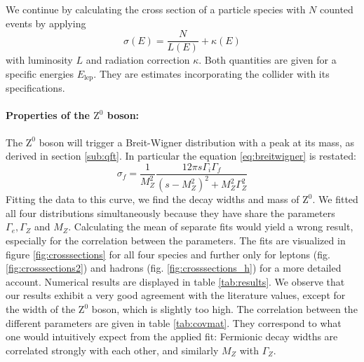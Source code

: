 We continue by calculating the cross section of a particle species with $N$ counted events by applying  
\begin{equation}
    \sigma(E) = \frac{N}{L(E)} + \kappa(E)
\end{equation}
with luminosity $L$ and radiation correction $\kappa$. Both quantities are given for a specific energies $E_\mathrm{lep}$. 
They are estimates incorporating the collider with its specifications.
\paragraph{\textbf{Properties of the $\mathrm{Z^0}$ boson:}}
\label{par:Z0}
The $\mathrm{Z^0}$ boson will trigger a Breit-Wigner distribution
with a peak at its mass, as derived in section \ref{sub:qft}. In particular the equation 
\eqref{eq:breitwigner} is restated:
\begin{equation*}
    \sigma_f = \frac{1}{M_Z^2} \frac{12\pi s \Gamma_i \Gamma_f }{(s- M_Z^2)^2 + M_Z^2 \Gamma_Z^2}
\end{equation*}
Fitting the data to this curve, we find the decay widths and mass of $\mathrm{Z^0}$. 
We fitted all four distributions simultaneously because they have share the parameters $\Gamma_e, \Gamma_Z$ and $M_Z$. 
Calculating the mean of separate fits would yield a wrong result, especially for the correlation between the parameters. 
The fits are visualized in figure \ref{fig:crosssections} for all 
four species and further only for leptons (fig. \ref{fig:crosssections2}) and hadrons (fig. \ref{fig:crosssections_h})
for a more detailed account. Numerical results are displayed in table \ref{tab:results}.
We observe that our results exhibit a very good agreement with the literature
values, except for the width of the $\mathrm{Z^0}$ boson, which is slightly too high. 
The correlation between the different parameters are 
given in table \ref{tab:covmat}. They correspond to what one would intuitively expect from the applied fit: Fermionic decay
widths are correlated strongly with each other, and similarly $M_Z$ with $\Gamma_Z$.

